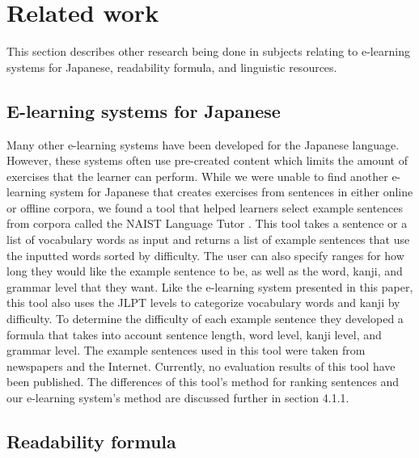 \documentclass[english]{jnlp_1.4}
\begin{document}
\section{Related work}

This section describes other research being done in subjects relating to e-learning systems for Japanese, readability formula, and linguistic resources.

\subsection{E-learning systems for Japanese}

Many other e-learning systems have been developed for the Japanese language. However, these systems often use pre-created content which limits the amount of exercises that the learner can perform. While we were unable to find another e-learning system for Japanese that creates exercises from sentences in either online or offline corpora, we found a tool that helped learners select example sentences from corpora called the NAIST Language Tutor \cite{Inproc_Mizuno}. This tool takes a sentence or a list of vocabulary words as input and returns a list of example sentences that use the inputted words sorted by difficulty. The user can also specify ranges for how long they would like the example sentence to be, as well as the word, kanji, and grammar level that they want. Like the e-learning system presented in this paper, this tool also uses the JLPT levels to categorize vocabulary words and kanji by difficulty. To determine the difficulty of each example sentence they developed a formula that takes into account sentence length, word level, kanji level, and grammar level. The example sentences used in this tool were taken from newspapers and the Internet. Currently, no evaluation results of this tool have been published. The differences of this tool's method for ranking sentences and our e-learning system's method are discussed further in section 4.1.1.

\subsection{Readability formula}
\end{document}
